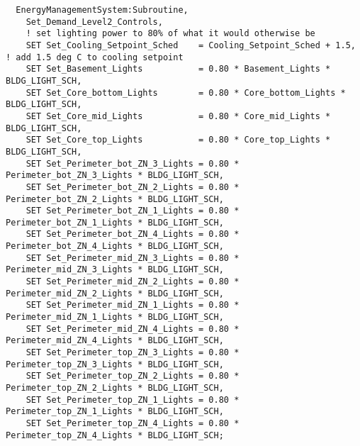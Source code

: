 \begin{lstlisting}
  EnergyManagementSystem:Subroutine,
    Set_Demand_Level2_Controls,
    ! set lighting power to 80% of what it would otherwise be
    SET Set_Cooling_Setpoint_Sched    = Cooling_Setpoint_Sched + 1.5, ! add 1.5 deg C to cooling setpoint
    SET Set_Basement_Lights           = 0.80 * Basement_Lights * BLDG_LIGHT_SCH,
    SET Set_Core_bottom_Lights        = 0.80 * Core_bottom_Lights * BLDG_LIGHT_SCH,
    SET Set_Core_mid_Lights           = 0.80 * Core_mid_Lights * BLDG_LIGHT_SCH,
    SET Set_Core_top_Lights           = 0.80 * Core_top_Lights * BLDG_LIGHT_SCH,
    SET Set_Perimeter_bot_ZN_3_Lights = 0.80 * Perimeter_bot_ZN_3_Lights * BLDG_LIGHT_SCH,
    SET Set_Perimeter_bot_ZN_2_Lights = 0.80 * Perimeter_bot_ZN_2_Lights * BLDG_LIGHT_SCH,
    SET Set_Perimeter_bot_ZN_1_Lights = 0.80 * Perimeter_bot_ZN_1_Lights * BLDG_LIGHT_SCH,
    SET Set_Perimeter_bot_ZN_4_Lights = 0.80 * Perimeter_bot_ZN_4_Lights * BLDG_LIGHT_SCH,
    SET Set_Perimeter_mid_ZN_3_Lights = 0.80 * Perimeter_mid_ZN_3_Lights * BLDG_LIGHT_SCH,
    SET Set_Perimeter_mid_ZN_2_Lights = 0.80 * Perimeter_mid_ZN_2_Lights * BLDG_LIGHT_SCH,
    SET Set_Perimeter_mid_ZN_1_Lights = 0.80 * Perimeter_mid_ZN_1_Lights * BLDG_LIGHT_SCH,
    SET Set_Perimeter_mid_ZN_4_Lights = 0.80 * Perimeter_mid_ZN_4_Lights * BLDG_LIGHT_SCH,
    SET Set_Perimeter_top_ZN_3_Lights = 0.80 * Perimeter_top_ZN_3_Lights * BLDG_LIGHT_SCH,
    SET Set_Perimeter_top_ZN_2_Lights = 0.80 * Perimeter_top_ZN_2_Lights * BLDG_LIGHT_SCH,
    SET Set_Perimeter_top_ZN_1_Lights = 0.80 * Perimeter_top_ZN_1_Lights * BLDG_LIGHT_SCH,
    SET Set_Perimeter_top_ZN_4_Lights = 0.80 * Perimeter_top_ZN_4_Lights * BLDG_LIGHT_SCH;





\end{lstlisting}
